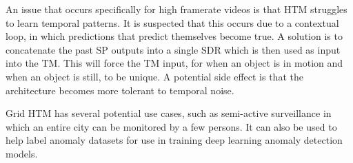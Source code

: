 An issue that occurs specifically for high framerate videos is that HTM struggles to learn temporal patterns. It is suspected that this occurs due to a contextual loop, in which predictions that predict themselves become true. A solution is to concatenate the past SP outputs into a single SDR which is then used as input into the TM. This will force the TM input, for when an object is in motion and when an object is still, to be unique. A potential side effect is that the architecture becomes more tolerant to temporal noise.
\par
Grid HTM has several potential use cases, such as semi-active surveillance in which an entire city can be monitored by a few persons. It can also be used to help label anomaly datasets for use in training deep learning anomaly detection models.
